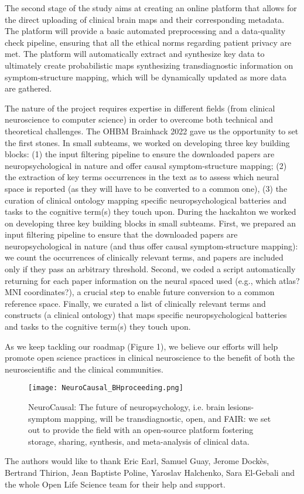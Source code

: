 \documentclass[../main.tex]{subfiles}
\begin{document}
The second stage of the study aims at creating an online platform that allows for the direct uploading of clinical brain maps and their corresponding metadata. The platform will provide a basic automated preprocessing and a data-quality check pipeline, ensuring that all the ethical norms regarding patient privacy are met. The platform will automatically extract and synthesize key data to ultimately create probabilistic maps synthesizing transdiagnostic information on symptom-structure mapping, which will be dynamically updated as more data are gathered.

The nature of the project requires expertise in different fields (from clinical neuroscience to computer science) in order to overcome both technical and theoretical challenges. The OHBM Brainhack 2022 gave us the opportunity to set the first stones. In small subteams, we worked on developing three key building blocks: (1) the input filtering pipeline to ensure the downloaded papers are neuropsychological in nature and offer causal symptom-structure mapping; (2) the extraction of key terms occurrences in the text as to assess which neural space is reported (as they will have to be converted to a common one), (3) the curation of clinical ontology mapping specific neuropsychological batteries and tasks to the cognitive term(s) they touch upon.
During the hackahton we worked on developing three key building blocks in small subteams. First, we prepared an input filtering pipeline to ensure that the downloaded papers are neuropsychological in nature (and thus offer causal symptom-structure mapping): we count the occurrences of clinically relevant terms, and papers are included only if they pass an arbitrary threshold. Second, we coded a script automatically returning for each paper information on the neural spaced used (e.g., which atlas? MNI coordinates?), a crucial step to enable future conversion to a common reference space. Finally, we curated a list of clinically relevant terms and constructs (a clinical ontology) that maps specific neuropsychological batteries and tasks to the cognitive term(s) they touch upon.

As we keep tackling our roadmap (Figure 1), we believe our efforts will help promote open science practices in clinical neuroscience to the benefit of both the neuroscientific and the clinical communities.


\begin{figure}
	\centering
	\texttt{[image: NeuroCausal\_BHproceeding.png]}
	\caption{NeuroCausal: The future of neuropsychology, i.e. brain lesions-symptom mapping, will be transdiagnostic, open, and FAIR: we set out to provide the field with an open-source platform fostering storage, sharing, synthesis, and meta-analysis of clinical data.
}
	\label{fig:NeuroCausal}
\end{figure}

 The authors would like to thank Eric Earl, Samuel Guay, Jerome Dockès, Bertrand Thirion, Jean Baptiste Poline, Yaroslav Halchenko, Sara El-Gebali and the whole Open Life Science team for their help and support.
\end{document}
